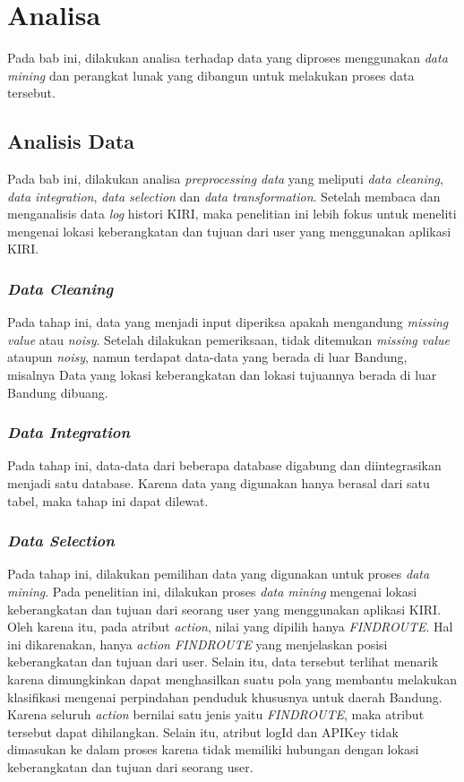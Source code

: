 \chapter{Analisa}

Pada bab ini, dilakukan analisa terhadap data yang diproses menggunakan \textsl{data mining} dan perangkat lunak yang dibangun untuk melakukan proses data tersebut.

\section{Analisis Data}
\label{analisisData}
Pada bab ini, dilakukan analisa \textsl{preprocessing data} yang meliputi \textsl{data cleaning}, \textsl{data integration}, \textsl{data selection} dan \textsl{data transformation}. Setelah membaca dan menganalisis data \textsl{log} histori KIRI, maka penelitian ini lebih fokus untuk meneliti mengenai lokasi keberangkatan dan tujuan dari user yang menggunakan aplikasi KIRI.

\subsection{\textsl{Data Cleaning}}
Pada tahap ini, data yang  menjadi input diperiksa apakah mengandung \textsl{missing value} atau \textsl{noisy}. Setelah dilakukan pemeriksaan, tidak ditemukan \textsl{missing value} ataupun \textsl{noisy}, namun terdapat data-data yang berada di luar Bandung, misalnya Data yang lokasi keberangkatan dan lokasi tujuannya berada di luar Bandung dibuang.

\subsection{\textsl{Data Integration}}
Pada tahap ini, data-data dari beberapa database digabung dan diintegrasikan menjadi satu database. Karena data yang digunakan hanya berasal dari satu tabel, maka tahap ini dapat dilewat.

\subsection{\textsl{Data Selection}}
Pada tahap ini, dilakukan pemilihan data yang digunakan untuk proses \textsl{data mining}. Pada penelitian ini, dilakukan proses \textsl{data mining} mengenai lokasi keberangkatan dan tujuan dari seorang user yang menggunakan aplikasi KIRI. Oleh karena itu, pada atribut \textsl{action}, nilai yang dipilih hanya \textsl{FINDROUTE}. Hal ini dikarenakan, hanya \textsl{action FINDROUTE} yang menjelaskan posisi keberangkatan dan tujuan dari user. Selain itu, data tersebut terlihat menarik karena dimungkinkan dapat menghasilkan suatu pola yang membantu melakukan klasifikasi mengenai perpindahan penduduk khususnya untuk daerah Bandung. Karena seluruh \textsl{action} bernilai satu jenis yaitu \textsl{FINDROUTE}, maka atribut tersebut dapat dihilangkan. Selain itu, atribut logId dan APIKey tidak  dimasukan ke dalam proses karena tidak memiliki hubungan dengan lokasi keberangkatan dan tujuan dari seorang user.


